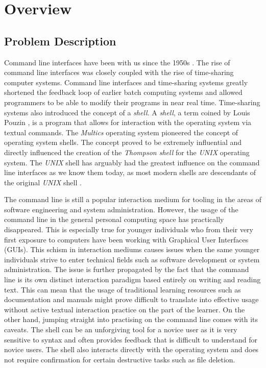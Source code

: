 \chapter{Overview}
\label{chap:overview}
\section{Problem Description}


Command line interfaces have been with us since the 1950s
\cite{raymond2004art}. The rise of command line interfaces was closely coupled
with the rise of time-sharing computer systems. Command line interfaces and
time-sharing systems greatly shortened the feedback loop of earlier batch
computing systems and allowed programmers to be able to modify their programs
in near real time. Time-sharing systems also introduced the concept of a
\textit{shell}. A \textit{shell}, a term coined by Louis Pouzin \cite{pouzin},
is a program that allows for interaction with the operating system via textual
commands. The \textit{Multics}\cite{corbato1965introduction} operating system
pioneered the concept of operating system shells. The concept proved to be
extremely influential and directly influenced the creation of the
\textit{Thompson shell} for the \textit{UNIX} operating system. The
\textit{UNIX} shell has arguably had the greatest influence on the command line
interfaces as we know them today, as most modern shells are descendants of the
original \textit{UNIX} shell \cite{raymond2004art}.

The command line is still a popular interaction medium for tooling in the areas
of software engineering and system administration. However, the usage of the
command line in the general personal computing space has practically
disappeared. This is especially true for younger individuals who from their
very first exposure to computers have been working with Graphical User
Interfaces (GUIs). This schism in interaction mediums causes issues when the
same younger individuals strive to enter technical fields such as software
development or system administration. The issue is further propagated by the
fact that the command line is its own distinct interaction paradigm
based entirely on writing and reading text. This can mean that the usage of
traditional learning resources such as documentation and manuals might prove
difficult to translate into effective usage without active textual interaction
practice on the part of the learner. On the other hand, jumping straight into
practising on the command line comes with its caveats. The shell can be an
unforgiving tool for a novice user as it is very sensitive to syntax and often
provides feedback that is difficult to understand for novice users. The shell
also interacts directly with the operating system and does not require
confirmation for certain destructive tasks such as file deletion.

